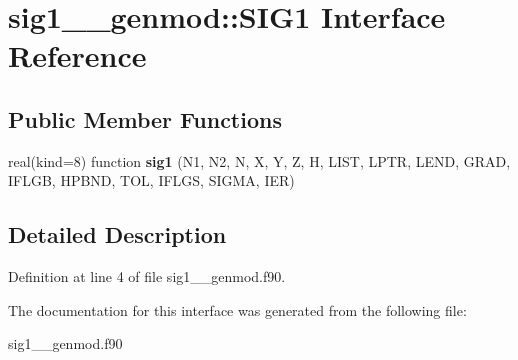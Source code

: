 \hypertarget{interfacesig1____genmod_1_1_s_i_g1}{\section{sig1\+\_\+\+\_\+genmod\+:\+:S\+I\+G1 Interface Reference}
\label{interfacesig1____genmod_1_1_s_i_g1}
}
\subsection*{Public Member Functions}
\begin{DoxyCompactItemize}
\item 
\hypertarget{interfacesig1____genmod_1_1_s_i_g1_afd132f3d65d04e89aa7fdc1248aeb915}{real(kind=8) function {\bfseries sig1} (N1, N2, N, X, Y, Z, H, L\+I\+S\+T, L\+P\+T\+R, L\+E\+N\+D, G\+R\+A\+D, I\+F\+L\+G\+B, H\+P\+B\+N\+D, T\+O\+L, I\+F\+L\+G\+S, S\+I\+G\+M\+A, I\+E\+R)}\label{interfacesig1____genmod_1_1_s_i_g1_afd132f3d65d04e89aa7fdc1248aeb915}

\end{DoxyCompactItemize}


\subsection{Detailed Description}


Definition at line 4 of file sig1\+\_\+\+\_\+genmod.\+f90.



The documentation for this interface was generated from the following file\+:\begin{DoxyCompactItemize}
\item 
sig1\+\_\+\+\_\+genmod.\+f90\end{DoxyCompactItemize}
